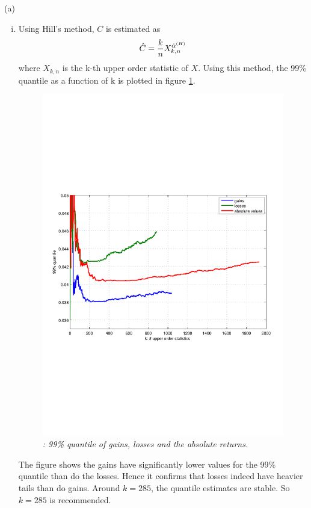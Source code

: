 \documentclass{report}
\begin{document}
\begin{enumerate}[1.]
\begin{enumerate}{(a)}
\begin{enumerate}[(i)]
    \item Using Hill's method, $C$ is estimated as
      \[
      \hat{C} = {k \over n} X_{k, n}^{\hat{\alpha}^{(H)}}
      \]
      where $X_{k,n}$ is the k-th upper order statistic of $X$. Using
      this method, the 99\% quantile as a function of k is plotted in
      figure \ref{fig:99_percentile}.
      \begin{figure}[htb!]
        \centering
        \includegraphics[scale=0.6, clip=true, trim=20 233 28
        185]{99_percentile.pdf}
        \caption{\small \it: 99\% quantile of gains, losses and the
          absolute returns.}
        \label{fig:99_percentile}
      \end{figure}

      The figure shows the gains have significantly lower values for the 99\%
      quantile than do the losses. Hence it confirms that losses
      indeed have heavier tails than do gains. Around $k=285$, the
      quantile estimates are stable. So $k=285$ is recommended.
    \end{enumerate}
  \end{enumerate}
\end{enumerate}
\end{document}
